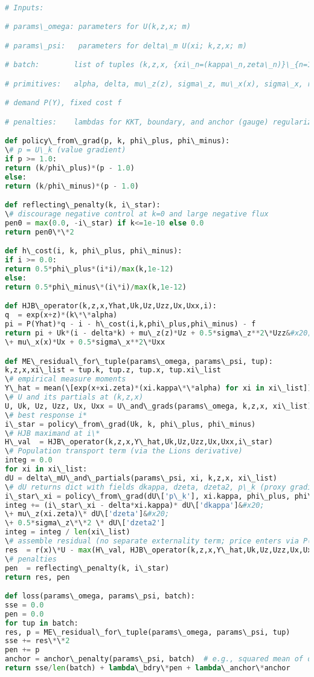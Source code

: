 ﻿\documentclass[11pt,letterpaper,oneside]{article}
\numberwithin{equation}{section}
\newcommand{\1}{\mathbf{1}}
\begin{document}
\begin{lstlisting}[language=Python,caption={Pseudo-JAX for (ME) residual with empirical measure}]

# Inputs:

# params\_omega: parameters for U(k,z,x; m)

# params\_psi:   parameters for delta\_m U(xi; k,z,x; m)

# batch:        list of tuples (k,z,x, {xi\_n=(kappa\_n,zeta\_n)}\_{n=1}^N )

# primitives:   alpha, delta, mu\_z(z), sigma\_z, mu\_x(x), sigma\_x, r(x),

# demand P(Y), fixed cost f

# penalties:    lambdas for KKT, boundary, and anchor (gauge) regularizers

def policy\_from\_grad(p, k, phi\_plus, phi\_minus):
\# p = U\_k (value gradient)
if p >= 1.0:
return (k/phi\_plus)*(p - 1.0)
else:
return (k/phi\_minus)*(p - 1.0)

def reflecting\_penalty(k, i\_star):
\# discourage negative control at k=0 and large negative flux
pen0 = max(0.0, -i\_star) if k<=1e-10 else 0.0
return pen0\*\*2

def h\_cost(i, k, phi\_plus, phi\_minus):
if i >= 0.0:
return 0.5*phi\_plus*(i*i)/max(k,1e-12)
else:
return 0.5*phi\_minus\*(i\*i)/max(k,1e-12)

def HJB\_operator(k,z,x,Yhat,Uk,Uz,Uzz,Ux,Uxx,i):
q  = exp(x+z)*(k\*\*alpha)
pi = P(Yhat)*q - i - h\_cost(i,k,phi\_plus,phi\_minus) - f
return pi + Uk*(i - delta*k) + mu\_z(z)*Uz + 0.5*sigma\_z**2\*Uzz&#x20;
\+ mu\_x(x)*Ux + 0.5*sigma\_x**2\*Uxx

def ME\_residual\_for\_tuple(params\_omega, params\_psi, tup):
k,z,x,xi\_list = tup.k, tup.z, tup.x, tup.xi\_list
\# empirical measure moments
Y\_hat = mean(\[exp(x+xi.zeta)*(xi.kappa\*\*alpha) for xi in xi\_list])
\# U and its partials at (k,z,x)
U, Uk, Uz, Uzz, Ux, Uxx = U\_and\_grads(params\_omega, k,z,x, xi\_list)
\# best response i*
i\_star = policy\_from\_grad(Uk, k, phi\_plus, phi\_minus)
\# HJB maximand at i\*
H\_val  = HJB\_operator(k,z,x,Y\_hat,Uk,Uz,Uzz,Ux,Uxx,i\_star)
\# Population transport term (via the Lions derivative)
integ = 0.0
for xi in xi\_list:
dU = delta\_mU\_and\_partials(params\_psi, xi, k,z,x, xi\_list)
\# dU returns dict with fields dkappa, dzeta, dzeta2, p\_k (proxy gradient)
i\_star\_xi = policy\_from\_grad(dU\['p\_k'], xi.kappa, phi\_plus, phi\_minus)
integ += (i\_star\_xi - delta*xi.kappa)* dU\['dkappa']&#x20;
\+ mu\_z(xi.zeta)\* dU\['dzeta']&#x20;
\+ 0.5*sigma\_z\*\*2 \* dU\['dzeta2']
integ = integ / len(xi\_list)
\# assemble residual (no separate externality term; price enters via P(Yhat) in HJB)
res  = r(x)\*U - max(H\_val, HJB\_operator(k,z,x,Y\_hat,Uk,Uz,Uzz,Ux,Uxx,0.0))&#x20;\- integ
\# penalties
pen  = reflecting\_penalty(k, i\_star)
return res, pen

def loss(params\_omega, params\_psi, batch):
sse = 0.0
pen = 0.0
for tup in batch:
res, p = ME\_residual\_for\_tuple(params\_omega, params\_psi, tup)
sse += res\*\*2
pen += p
anchor = anchor\_penalty(params\_psi, batch)  # e.g., squared mean of dmU over batch
return sse/len(batch) + lambda\_bdry\*pen + lambda\_anchor\*anchor
\end{lstlisting}
\end{document}
